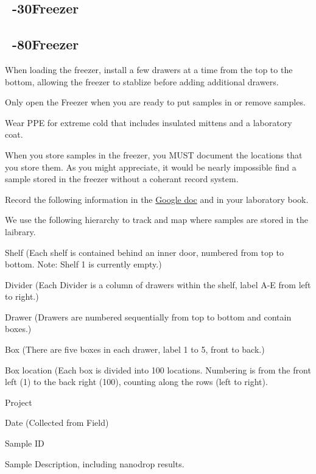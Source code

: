 \documentclass[12pt]{../SOP3_alpha}\usepackage[]{graphicx}\usepackage[]{xcolor}
\begin{document}
\NP 

\subsection{~-30\degree Freezer}

\NP 

\subsection{~-80\degree Freezer}

\NP When loading the freezer, install a few drawers at a time from the top to the bottom, allowing the freezer to stablize before adding additional drawers.

\NP Only open the Freezer when you are ready to put samples in or remove samples. 

\NP Wear PPE for extreme cold that includes insulated mittens and a laboratory coat.

\NP When you store samples in the freezer, you MUST document the locations that you store them. As you might appreciate, it would be nearly impossible find a sample stored in the freezer without a coherant record system.

\NP Record the following information in the \href{https://docs.google.com/spreadsheets/d/1ohQFRFMBHCu2Wm8H58UH67SJ_uvwSsbRFGZVjZr9Bjc/edit?usp=sharing}{Google doc} and in your laboratory book.

We use the following hierarchy to track and map where samples are stored in the laibrary. 
\begin{itemize*}
  \item Shelf (Each shelf is contained behind an inner door, numbered from top to bottom. Note: Shelf 1 is currently empty.)
  \item Divider (Each Divider is a column of drawers within the shelf, label A-E from left to right.)
  \item Drawer (Drawers are numbered sequentially from top to bottom and contain boxes.)
  \item Box (There are five boxes in each drawer, label 1 to 5, front to back.)
  \item Box location (Each box is divided into 100 locations. Numbering is from the front left (1) to the back right (100), counting along the rows (left to right).
  \item Project
  \item Date (Collected from Field)
  \item Sample ID
  \item Sample Description, including nanodrop results.
\end{itemize*}
\end{document}
